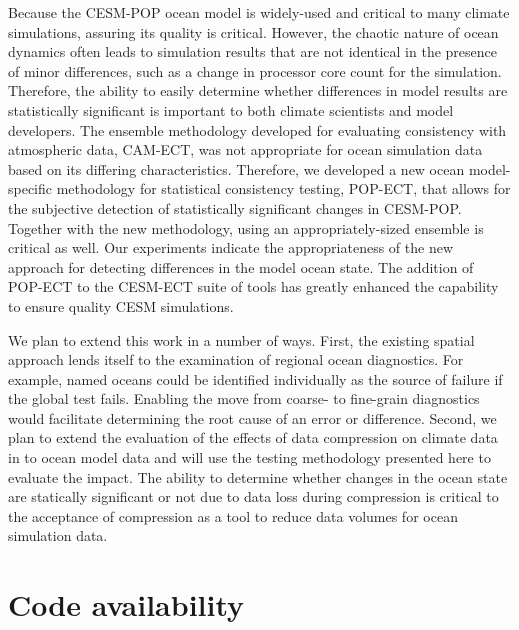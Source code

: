 \documentclass[gmd, manuscript]{copernicus}
\begin{document}
Because the CESM-POP ocean model is widely-used and critical to many climate simulations, assuring its quality is critical. However, the chaotic nature of ocean dynamics often leads to simulation results that are not identical in the presence of minor differences, such as a change in processor core count for the simulation.  Therefore, the ability to easily determine whether differences in model results are statistically significant is important to both climate scientists and model developers.  The ensemble methodology developed for evaluating consistency with atmospheric data, CAM-ECT, was not appropriate for ocean simulation data based on its differing characteristics.  Therefore, we developed a new ocean model-specific methodology for statistical consistency testing, POP-ECT, that allows for the subjective detection of statistically significant changes in CESM-POP.  Together with the new methodology, using an appropriately-sized ensemble is critical as well. Our experiments indicate the appropriateness of the new approach for detecting differences in the model ocean state. The addition of POP-ECT to the CESM-ECT suite of tools has greatly enhanced the capability to ensure quality CESM simulations.

We plan to extend this work in a number of ways.  First, the existing spatial approach lends itself to the examination of regional ocean diagnostics.  For example, named oceans could be identified individually as the source of failure if the global test fails.  Enabling the move from coarse- to fine-grain diagnostics would facilitate determining the root cause of an error or difference.  Second, we plan to extend the evaluation of the effects of data compression on climate data in \cite{baker2014} to ocean model data and will use the testing methodology presented here to evaluate the impact. The ability to determine whether changes in the ocean state are statically significant or not due to data loss during compression is critical to the acceptance of compression as a tool to reduce data volumes for ocean simulation data.



  \section{Code availability}\label{sec:code}
\end{document}
